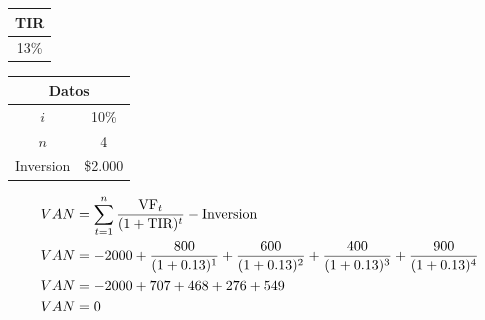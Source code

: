 \documentclass{templateNote}
\begin{document}
\begin{tcolorbox}[colback=blue!10!white,colframe=blue!60!black,title=Ejemplo]

    \begin{minipage}{0.5\textwidth}
        \centering
        \begin{tabular}{|c|}
            \hline
            \multicolumn{1}{|c|}{\textbf{TIR}} \\ \hline
            13\% \\ \hline
        \end{tabular}
    \end{minipage}
    \begin{minipage}{0.5\textwidth}
        \centering
        \begin{tabular}{|c|c|}
            \hline
            \multicolumn{2}{|c|}{\textbf{Datos}} \\ \hline
            $i$ & 10\% \\ \hline
            $n$ & 4 \\ \hline
            Inversion & \$2.000 \\ \hline
        \end{tabular}
    \end{minipage}

    \begin{align*}
        VAN &= \sum_{t=1}^{n} \frac{{\textnormal{VF}}_t}{(1 + \textnormal{{TIR}})^t} - \textnormal{Inversion} \\
        VAN &= -2000 + \frac{800}{(1 + 0.13)^1} + \frac{600}{(1 + 0.13)^2} + \frac{400}{(1 + 0.13)^3} + \frac{900}{(1 + 0.13)^4} \\
        VAN &= -2000 + 707 + 468 + 276 + 549\\
        VAN &= 0\\
    \end{align*}

\end{tcolorbox}
\newpage
\end{document}
